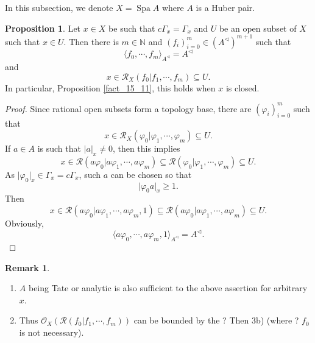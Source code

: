 \documentclass[10pt]{article}
\numberwithin{equation}{section}
\theoremstyle{definition}
\newtheorem{proposition}{Proposition}[subsection]
\newtheorem{remark}{Remark}[subsection]
\DeclareMathOperator{\Spa}{Spa}
\newcommand{\N}[0]{\mathbb{N}}
\newcommand{\cR}[0]{\mathcal{R}}
\newcommand{\ab}[1]{\vert #1 \vert}
\newcommand{\cGamma}[0]{c\Gamma}
\begin{document}
In this subsection, we denote $X=\Spa A$ where $A$ is a Huber pair.

\begin{proposition}
    \label{proposition_23_1}
    Let $x\in X$ be such that $\cGamma_x = \Gamma_x$ and $U$ be an open subset of $X$ such that $x\in U$. Then there is $m\in\N$ and $(f_i)_{i=0}^m\in(A^\triangleleft)^{m+1}$ such that
    \begin{equation*}
        \langle f_0,\cdots,f_m\rangle_{A^\triangleleft} = A^\triangleleft
    \end{equation*}
    and
    \begin{equation*}
        x\in\cR_X(f_0|f_1,\cdots,f_m)\subseteq U.
    \end{equation*}
    In particular, Proposition \ref{fact_15_11}, this holds when $x$ is closed.
\end{proposition}

\begin{proof}
    Since rational open subsets form a topology base, there are $(\varphi_i)_{i=0}^m$ such that
    \begin{equation*}
        x\in\cR_X(\varphi_0|\varphi_1,\cdots,\varphi_m)\subseteq U.
    \end{equation*}
    If $a\in A$ is such that $\ab{a}_x\not=0$, then this implies
    \begin{equation*}
        x\in\cR(a\varphi_0|a\varphi_1,\cdots,a\varphi_m)\subseteq\cR(\varphi_0|\varphi_1,\cdots,\varphi_m)\subseteq U.
    \end{equation*}
    As $\ab{\varphi_0}_x\in\Gamma_x = \cGamma_x$, such $a$ can be chosen so that
    \begin{equation*}
        \ab{\varphi_0a}_x\geq 1.
    \end{equation*}
    Then
    \begin{equation*}
        x\in\cR(a\varphi_0|a\varphi_1,\cdots,a\varphi_m,1)\subseteq\cR(a\varphi_0|a\varphi_1,\cdots,a\varphi_m)\subseteq U.
    \end{equation*}
    Obviously,
    \begin{equation*}
        \langle a\varphi_0,\cdots,a\varphi_m,1\rangle_{A^\triangleleft} = A^\triangleleft.
    \end{equation*}
\end{proof}

\begin{remark}$\:$
    \begin{enumerate}
        \item $A$ being Tate or analytic is also sufficient to the above assertion for arbitrary $x$.
        \item Thus $\mathcal{O}_X(\cR(f_0|f_1,\cdots,f_m))$ can be bounded by the ? Then 3b) (where ? $f_0$ is not necessary).
    \end{enumerate}
\end{remark}
\end{document}
